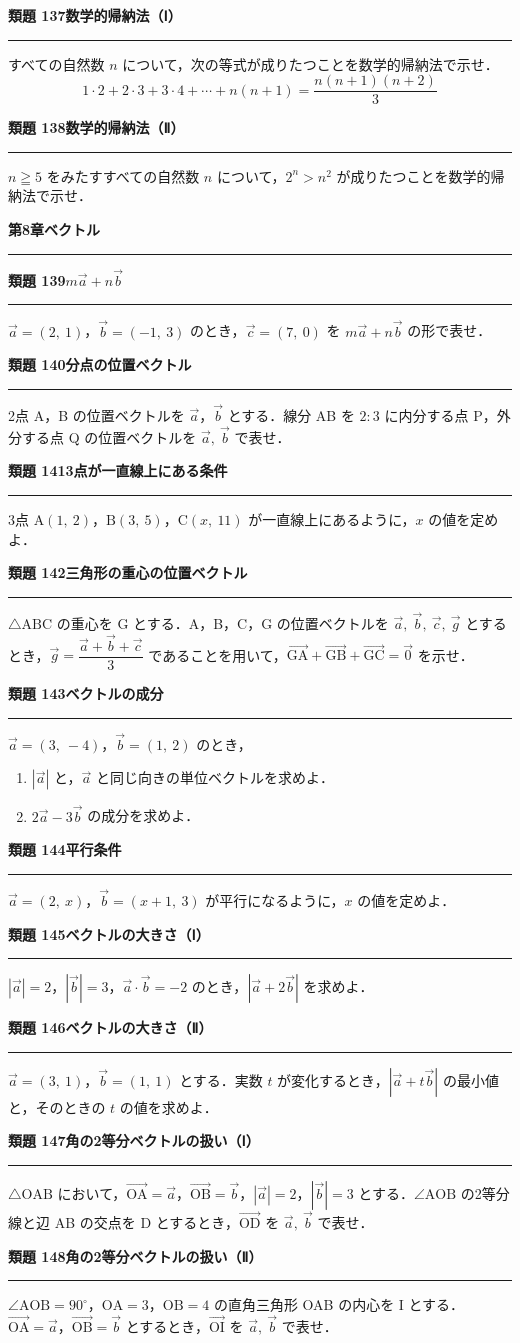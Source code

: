 \documentclass[a4paper,11pt]{ltjsarticle}
\newcommand{\mon}[2]{\Needspace{7\baselineskip}\vspace{10pt}%
  {\sffamily\bfseries 類題 #1\quad #2\par}\vspace{2pt}\hrule\vspace{4pt}}
\newcommand{\shou}[2]{\clearpage\markboth{#1\quad #2}{}%
  {\sffamily\bfseries\LARGE #1\quad #2\par}\vspace{2pt}\hrule height 1.2pt\vspace{4pt}}
\begin{document}
\mon{137}{数学的帰納法（Ⅰ）}
すべての自然数 $n$ について，次の等式が成りたつことを数学的帰納法で示せ．
\[1\cdot2+2\cdot3+3\cdot4+\cdots+n(n+1)=\frac{n(n+1)(n+2)}3\]

\mon{138}{数学的帰納法（Ⅱ）}
$n\geqq5$ をみたすすべての自然数 $n$ について，$2^n>n^2$ が成りたつことを数学的帰納法で示せ．

\shou{第8章}{ベクトル}
\mon{139}{$m\vec a+n\vec b$}
$\vec a=(2,\ 1)$，$\vec b=(-1,\ 3)$ のとき，$\vec c=(7,\ 0)$ を $m\vec a+n\vec b$ の形で表せ．

\mon{140}{分点の位置ベクトル}
2点 A，B の位置ベクトルを $\vec a$，$\vec b$ とする．線分 AB を $2:3$ に内分する点 P，外分する点 Q の位置ベクトルを $\vec a,\ \vec b$ で表せ．

\mon{141}{3点が一直線上にある条件}
3点 $\mathrm A(1,\ 2)$，$\mathrm B(3,\ 5)$，$\mathrm C(x,\ 11)$ が一直線上にあるように，$x$ の値を定めよ．

\mon{142}{三角形の重心の位置ベクトル}
$\triangle\mathrm{ABC}$ の重心を G とする．A，B，C，G の位置ベクトルを $\vec a,\ \vec b,\ \vec c,\ \vec g$ とするとき，$\vec g=\dfrac{\vec a+\vec b+\vec c}3$ であることを用いて，$\overrightarrow{\mathrm{GA}}+\overrightarrow{\mathrm{GB}}+\overrightarrow{\mathrm{GC}}=\vec0$ を示せ．

\mon{143}{ベクトルの成分}
$\vec a=(3,\ -4)$，$\vec b=(1,\ 2)$ のとき，
\begin{enumerate}
\item $|\vec a|$ と，$\vec a$ と同じ向きの単位ベクトルを求めよ．
\item $2\vec a-3\vec b$ の成分を求めよ．
\end{enumerate}

\mon{144}{平行条件}
$\vec a=(2,\ x)$，$\vec b=(x+1,\ 3)$ が平行になるように，$x$ の値を定めよ．

\mon{145}{ベクトルの大きさ（Ⅰ）}
$|\vec a|=2$，$|\vec b|=3$，$\vec a\cdot\vec b=-2$ のとき，$|\vec a+2\vec b|$ を求めよ．

\mon{146}{ベクトルの大きさ（Ⅱ）}
$\vec a=(3,\ 1)$，$\vec b=(1,\ 1)$ とする．実数 $t$ が変化するとき，$|\vec a+t\vec b|$ の最小値と，そのときの $t$ の値を求めよ．

\mon{147}{角の2等分ベクトルの扱い（Ⅰ）}
$\triangle\mathrm{OAB}$ において，$\overrightarrow{\mathrm{OA}}=\vec a$，$\overrightarrow{\mathrm{OB}}=\vec b$，$|\vec a|=2$，$|\vec b|=3$ とする．$\angle\mathrm{AOB}$ の2等分線と辺 AB の交点を D とするとき，$\overrightarrow{\mathrm{OD}}$ を $\vec a,\ \vec b$ で表せ．

\mon{148}{角の2等分ベクトルの扱い（Ⅱ）}
$\angle\mathrm{AOB}=90^\circ$，$\mathrm{OA}=3$，$\mathrm{OB}=4$ の直角三角形 OAB の内心を I とする．$\overrightarrow{\mathrm{OA}}=\vec a$，$\overrightarrow{\mathrm{OB}}=\vec b$ とするとき，$\overrightarrow{\mathrm{OI}}$ を $\vec a,\ \vec b$ で表せ．
\end{document}
